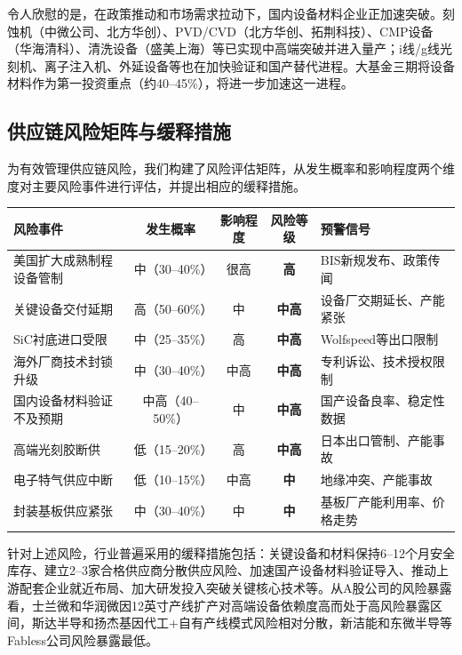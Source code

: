 令人欣慰的是，在政策推动和市场需求拉动下，国内设备材料企业正加速突破。刻蚀机（中微公司、北方华创）、PVD/CVD（北方华创、拓荆科技）、CMP设备（华海清科）、清洗设备（盛美上海）等已实现中高端突破并进入量产；i线/g线光刻机、离子注入机、外延设备等也在加快验证和国产替代进程。大基金三期将设备材料作为第一投资重点（约40--45\%），将进一步加速这一进程。

\subsection{供应链风险矩阵与缓释措施}

为有效管理供应链风险，我们构建了风险评估矩阵，从发生概率和影响程度两个维度对主要风险事件进行评估，并提出相应的缓释措施。

\begin{exhibitbox}[表 8-8：功率半导体供应链风险矩阵]
\centering
\small
\begin{tabularx}{\textwidth}{X c c c L{3.2cm}}
\toprule
\textbf{风险事件} & \textbf{发生概率} & \textbf{影响程度} & \textbf{风险等级} & \textbf{预警信号} \\
\midrule
美国扩大成熟制程设备管制 & 中（30--40\%） & 很高 & \textcolor{riskred}{\textbf{高}} & BIS新规发布、政策传闻 \\
关键设备交付延期 & 高（50--60\%） & 中 & \textcolor{riskamber}{\textbf{中高}} & 设备厂交期延长、产能紧张 \\
SiC衬底进口受限 & 中（25--35\%） & 高 & \textcolor{riskamber}{\textbf{中高}} & Wolfspeed等出口限制 \\
海外厂商技术封锁升级 & 中（30--40\%） & 中高 & \textcolor{riskamber}{\textbf{中高}} & 专利诉讼、技术授权限制 \\
国内设备材料验证不及预期 & 中高（40--50\%） & 中 & \textcolor{riskamber}{\textbf{中高}} & 国产设备良率、稳定性数据 \\
高端光刻胶断供 & 低（15--20\%） & 高 & \textcolor{riskamber}{\textbf{中高}} & 日本出口管制、产能事故 \\
电子特气供应中断 & 低（10--15\%） & 中高 & \textcolor{riskamber}{\textbf{中}} & 地缘冲突、产能事故 \\
封装基板供应紧张 & 中（30--40\%） & 中 & \textcolor{riskamber}{\textbf{中}} & 基板厂产能利用率、价格走势 \\
\bottomrule
\end{tabularx}
\end{exhibitbox}

针对上述风险，行业普遍采用的缓释措施包括：关键设备和材料保持6--12个月安全库存、建立2--3家合格供应商分散供应风险、加速国产设备材料验证导入、推动上游配套企业就近布局、加大研发投入突破关键核心技术等。从A股公司的风险暴露看，士兰微和华润微因12英寸产线扩产对高端设备依赖度高而处于高风险暴露区间，斯达半导和扬杰基因代工+自有产线模式风险相对分散，新洁能和东微半导等Fabless公司风险暴露最低。


